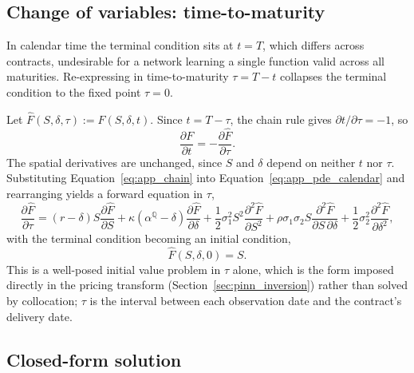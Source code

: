 \documentclass[11pt, a4paper]{article}
\newcommand{\convyield}{\delta}             %
\newcommand{\meanrev}{\kappa}               %
\newcommand{\longrun}{\alpha}               %
\begin{document}
\subsection{Change of variables: time-to-maturity}

In calendar time the terminal condition sits at $t = T$, which differs across contracts, undesirable for a network learning a single function valid across all maturities. Re-expressing in time-to-maturity $\tau = T - t$ collapses the terminal condition to the fixed point $\tau = 0$.

Let $\hat{F}(S, \convyield, \tau) := F(S, \convyield, t)$. Since $t = T - \tau$, the chain rule gives $\partial t/\partial \tau = -1$, so
\begin{equation}
  \label{eq:app_chain}
  \frac{\partial F}{\partial t} = -\frac{\partial \hat{F}}{\partial \tau}.
\end{equation}
\noindent
The spatial derivatives are unchanged, since $S$ and $\convyield$ depend on neither $t$ nor $\tau$. Substituting Equation~\ref{eq:app_chain} into Equation~\ref{eq:app_pde_calendar} and rearranging yields a forward equation in $\tau$,
\begin{equation}
  \label{eq:app_pde_tau}
  \frac{\partial \hat{F}}{\partial \tau}
  = (r - \convyield)S\frac{\partial \hat{F}}{\partial S}
  + \meanrev(\longrun^{\mathbb{Q}} - \convyield)\frac{\partial \hat{F}}{\partial \convyield}
  + \frac{1}{2}\sigma_1^2 S^2\frac{\partial^2 \hat{F}}{\partial S^2}
  + \rho\sigma_1\sigma_2 S\frac{\partial^2 \hat{F}}{\partial S\,\partial \convyield}
  + \frac{1}{2}\sigma_2^2\frac{\partial^2 \hat{F}}{\partial \convyield^2},
\end{equation}
\noindent
with the terminal condition becoming an initial condition,
\begin{equation}
  \label{eq:app_ic}
  \hat{F}(S, \convyield, 0) = S.
\end{equation}
\noindent
This is a well-posed initial value problem in $\tau$ alone, which is the form imposed directly in the pricing transform (Section~\ref{sec:pinn_inversion}) rather than solved by collocation; $\tau$ is the interval between each observation date and the contract's delivery date.

\subsection{Closed-form solution}
\end{document}
